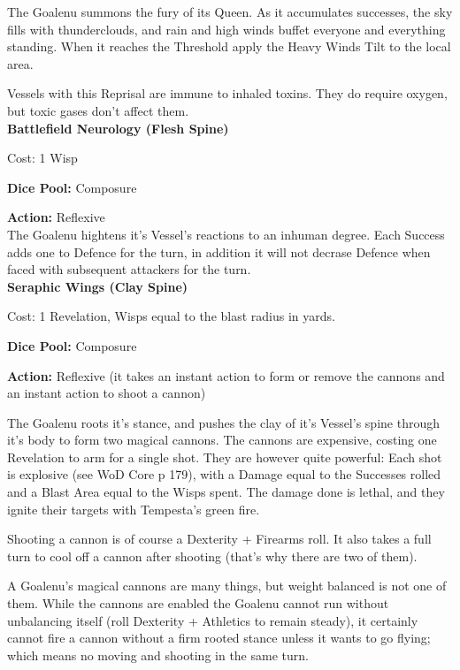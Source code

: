 \noindent The Goalenu summons the fury of its Queen. As it accumulates successes, the sky fills with thunderclouds, and rain and high winds buffet everyone and everything standing. When it reaches the Threshold apply the Heavy Winds Tilt to the local area.

Vessels with this Reprisal are immune to inhaled toxins.  They do require oxygen, but toxic gases don't affect them.\\

\noindent\textbf{Battlefield Neurology (Flesh Spine)}

\noindent Cost: 1 Wisp

\noindent\textbf{Dice Pool:} Composure

\noindent\textbf{Action:} Reflexive\\

The Goalenu hightens it's Vessel's reactions to an inhuman degree. Each Success adds one to Defence for the turn, in addition it will not decrase Defence when faced with subsequent attackers for the turn. \\

\noindent\textbf{Seraphic Wings (Clay Spine)}

\noindent Cost: 1 Revelation, Wisps equal to the blast radius in yards.

\noindent\textbf{Dice Pool:} Composure

\noindent\textbf{Action:} Reflexive (it takes an instant action to form or remove the cannons and an instant action to shoot a cannon)

The Goalenu roots it's stance, and pushes the clay of it's Vessel's spine through it's body to form two magical cannons. The cannons are expensive, costing one Revelation to arm for a single shot. They are however quite powerful: Each shot is explosive (see WoD Core p 179), with a Damage equal to the Successes rolled and a Blast Area equal to the Wisps spent. The damage done is lethal, and they ignite their targets with Tempesta's green fire. 

Shooting a cannon is of course a Dexterity + Firearms roll. It also takes a full turn to cool off a cannon after shooting (that's why there are two of them). 

A Goalenu's magical cannons are many things, but weight balanced is not one of them. While the cannons are enabled the Goalenu cannot run without unbalancing itself (roll Dexterity + Athletics to remain steady), it certainly cannot fire a cannon without a firm rooted stance unless it wants to go flying; which means no moving and shooting in the same turn. \\


